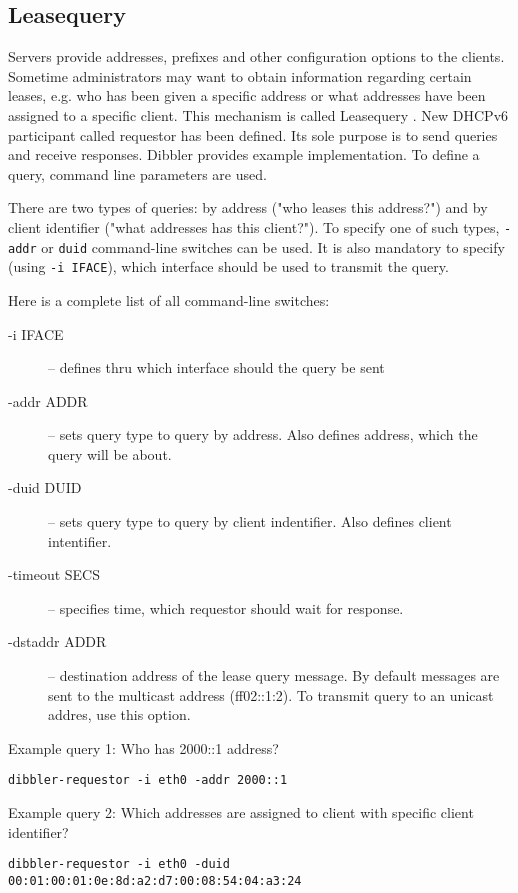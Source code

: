 \begin{enumerate}
\subsection{Leasequery}
\label{feature-leasequery}
Servers provide addresses, prefixes and other configuration options to
the clients. Sometime administrators may want to obtain information
regarding certain leases, e.g. who has been given a specific address
or what addresses have been assigned to a specific client. This
mechanism is called Leasequery \cite{rfc5007}. New DHCPv6 participant
called requestor has been defined. Its sole purpose is to send queries
and receive responses. Dibbler provides example implementation. To
define a query, command line parameters are used.

There are two types of queries: by address ("who leases this address?")
and by client identifier ("what addresses has this client?"). To specify
one of such types, \verb+-addr+ or \verb+duid+ command-line switches
can be used. It is also mandatory to specify (using \verb+-i IFACE+),
which interface should be used to transmit the query.

Here is a complete list of all command-line switches:

\begin{description}
\item[-i IFACE] -- defines thru which interface should the query be sent
\item[-addr ADDR] -- sets query type to query by address. Also defines
  address, which the query will be about.
\item[-duid DUID] -- sets query type to query by client
  indentifier. Also defines client intentifier.
\item[-timeout SECS] -- specifies time, which requestor should wait
  for response.
\item[-dstaddr ADDR] -- destination address of the lease query
  message. By default messages are sent to the multicast address
  (ff02::1:2). To transmit query to an unicast addres, use this option.
\end{description}

Example query 1: Who has 2000::1 address?

\begin{lstlisting}
dibbler-requestor -i eth0 -addr 2000::1
\end{lstlisting}

Example query 2: Which addresses are assigned to client with specific
client identifier?

\begin{lstlisting}
dibbler-requestor -i eth0 -duid 00:01:00:01:0e:8d:a2:d7:00:08:54:04:a3:24
\end{lstlisting}


\end{enumerate}
